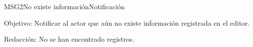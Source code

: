 \begin{mensaje}{MSG2}{No existe información}{Notificación}
	\item [Objetivo:] Notificar al actor que aún no existe información registrada en el editor.
	\item[Redacción:] No se han encontrado registros.
\end{mensaje}